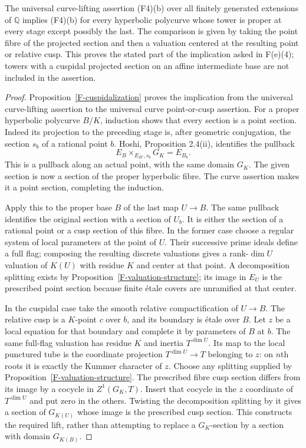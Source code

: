 \begin{proposition}
\label{F-proper-polycurve-lifting}
The universal curve-lifting assertion (F4)(b) over all finitely
generated extensions of $\mathbb Q$ implies (F4)(b) for every
hyperbolic polycurve whose tower is proper at every stage except
possibly the last. The comparison is given by taking the point
fibre of the projected section and then a valuation centered at
the resulting point or relative cusp. This proves the stated
part of the implication asked in F(e)(4); towers with a
cuspidal projected section on an affine intermediate base are
not included in the assertion.
\end{proposition}
\begin{proof}
Proposition~\ref{F-cuspidalization} proves the implication from
the universal curve-lifting assertion to the universal curve
point-or-cusp assertion. For a proper hyperbolic polycurve
$B/K$, induction shows that every section is a point section.
Indeed its projection to the preceding stage is, after geometric
conjugation, the section $s_b$ of a rational point $b$. Hoshi,
Proposition 2.4(ii), identifies the pullback
\[
 E_B\times_{E_{B'},s_b}G_K=E_{B_b}.
\]
This is a pullback along an actual point, with the same domain
$G_K$. The given section is now a section of the proper
hyperbolic fibre. The curve assertion makes it a point section,
completing the induction.

Apply this to the proper base $B$ of the last map $U\to B$.
The same pullback identifies the original section with a section
of $U_b$. It is either the section of a rational point or a cusp
section of this fibre. In the former case choose a regular system
of local parameters at the point of $U$. Their successive prime
ideals define a full flag; composing the resulting discrete
valuations gives a rank-$\dim U$ valuation of $K(U)$ with
residue $K$ and center at that point. A decomposition splitting
exists by Proposition~\ref{F-valuation-structure}; its image in
$E_U$ is the prescribed point section because finite \'etale
covers are unramified at that center.

In the cuspidal case take the smooth relative compactification
of $U\to B$. The relative cusp is a $K$-point $c$ over $b$,
and its boundary is \'etale over $B$. Let $z$ be a local
equation for that boundary and complete it by parameters of
$B$ at $b$. The same full-flag valuation has residue $K$ and
inertia $T^{\dim U}$. Its map to the local punctured tube is
the coordinate projection $T^{\dim U}\to T$ belonging to
$z$: on $n$th roots it is exactly the Kummer character of $z$.
Choose any splitting supplied by
Proposition~\ref{F-valuation-structure}. The prescribed fibre
cusp section differs from its image by a cocycle in
$Z^1(G_K,T)$. Insert that cocycle in the
$z$ coordinate of $T^{\dim U}$ and put zero in the others.
Twisting the decomposition splitting by it gives a section of
$G_{K(U)}$ whose image is the prescribed cusp section. This
constructs the required lift, rather than attempting to replace
a $G_K$-section by a section with domain $G_{K(B)}$.
\end{proof}

